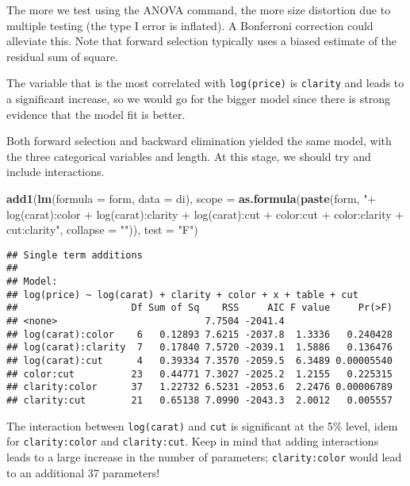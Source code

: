 \documentclass[]{book}
\newenvironment{Shaded}{\begin{snugshade}}{\end{snugshade}}
\newcommand{\DataTypeTok}[1]{\textcolor[rgb]{0.13,0.29,0.53}{#1}}
\newcommand{\KeywordTok}[1]{\textcolor[rgb]{0.13,0.29,0.53}{\textbf{#1}}}
\newcommand{\NormalTok}[1]{#1}
\newcommand{\StringTok}[1]{\textcolor[rgb]{0.31,0.60,0.02}{#1}}
\theoremstyle{definition}
\theoremstyle{definition}
\theoremstyle{definition}
\theoremstyle{remark}
\begin{document}
The more we test using the ANOVA command, the more size distortion due to multiple testing (the type I error is inflated). A Bonferroni correction could alleviate this. Note that forward selection typically uses a biased estimate of the residual sum of square.

The variable that is the most correlated with \texttt{log(price)} is \texttt{clarity} and leads to a significant increase, so we would go for the bigger model since there is strong evidence that the model fit is better.

Both forward selection and backward elimination yielded the same model, with the three categorical variables and length. At this stage, we should try and include interactions.

\begin{Shaded}
\begin{Highlighting}[]
\KeywordTok{add1}\NormalTok{(}\KeywordTok{lm}\NormalTok{(}\DataTypeTok{formula =}\NormalTok{ form, }\DataTypeTok{data =}\NormalTok{ di),}
        \DataTypeTok{scope =}  \KeywordTok{as.formula}\NormalTok{(}\KeywordTok{paste}\NormalTok{(form, }\StringTok{"+ log(carat):color + log(carat):clarity + }
\StringTok{                                  log(carat):cut + color:cut + color:clarity + cut:clarity"}\NormalTok{, }\DataTypeTok{collapse =} \StringTok{""}\NormalTok{)),}
     \DataTypeTok{test =} \StringTok{"F"}\NormalTok{)}
\end{Highlighting}
\end{Shaded}

\begin{verbatim}
## Single term additions
## 
## Model:
## log(price) ~ log(carat) + clarity + color + x + table + cut
##                    Df Sum of Sq    RSS     AIC F value     Pr(>F)
## <none>                          7.7504 -2041.4                   
## log(carat):color    6   0.12893 7.6215 -2037.8  1.3336   0.240428
## log(carat):clarity  7   0.17840 7.5720 -2039.1  1.5886   0.136476
## log(carat):cut      4   0.39334 7.3570 -2059.5  6.3489 0.00005540
## color:cut          23   0.44771 7.3027 -2025.2  1.2155   0.225315
## clarity:color      37   1.22732 6.5231 -2053.6  2.2476 0.00006789
## clarity:cut        21   0.65138 7.0990 -2043.3  2.0012   0.005557
\end{verbatim}

The interaction between \texttt{log(carat)} and \texttt{cut} is significant at the 5\% level, idem for \texttt{clarity:color} and \texttt{clarity:cut}. Keep in mind that adding interactions leads to a large increase in the number of parameters; \texttt{clarity:color} would lead to an additional 37 parameters!
\end{document}
